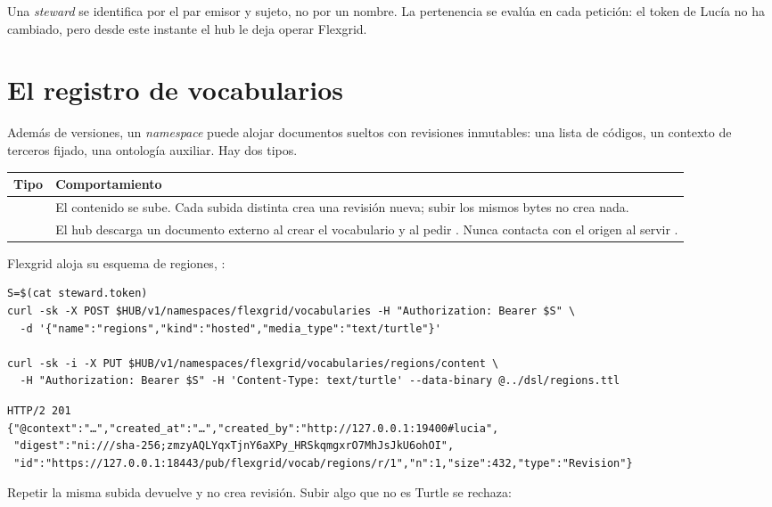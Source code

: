 Una \emph{steward} se identifica por el par emisor y sujeto, no por un nombre. La pertenencia se evalúa en cada
petición: el token de Lucía no ha cambiado, pero desde este instante el hub le deja operar Flexgrid.

\section{El registro de vocabularios}

Además de versiones, un \emph{namespace} puede alojar documentos sueltos con revisiones inmutables: una lista de
códigos, un contexto de terceros fijado, una ontología auxiliar. Hay dos tipos.

\noindent\begin{tabularx}{\linewidth}{@{}L{2cm}Y@{}}
\toprule
\textbf{Tipo} & \textbf{Comportamiento} \\
\midrule
{} & El contenido se sube. Cada subida distinta crea una revisión nueva; subir los mismos bytes no crea nada. \\
 & El hub descarga un documento externo al crear el vocabulario y al pedir . Nunca contacta con el origen al servir . \\
\bottomrule
\end{tabularx}

\medskip
Flexgrid aloja su esquema de regiones, :

\begin{lstlisting}[style=sh]
S=$(cat steward.token)
curl -sk -X POST $HUB/v1/namespaces/flexgrid/vocabularies -H "Authorization: Bearer $S" \
  -d '{"name":"regions","kind":"hosted","media_type":"text/turtle"}'

curl -sk -i -X PUT $HUB/v1/namespaces/flexgrid/vocabularies/regions/content \
  -H "Authorization: Bearer $S" -H 'Content-Type: text/turtle' --data-binary @../dsl/regions.ttl
\end{lstlisting}
\begin{lstlisting}[style=out]
HTTP/2 201
{"@context":"…","created_at":"…","created_by":"http://127.0.0.1:19400#lucia",
 "digest":"ni:///sha-256;zmzyAQLYqxTjnY6aXPy_HRSkqmgxrO7MhJsJkU6ohOI",
 "id":"https://127.0.0.1:18443/pub/flexgrid/vocab/regions/r/1","n":1,"size":432,"type":"Revision"}
\end{lstlisting}

Repetir la misma subida devuelve  y no crea revisión. Subir algo que no es Turtle se rechaza:

